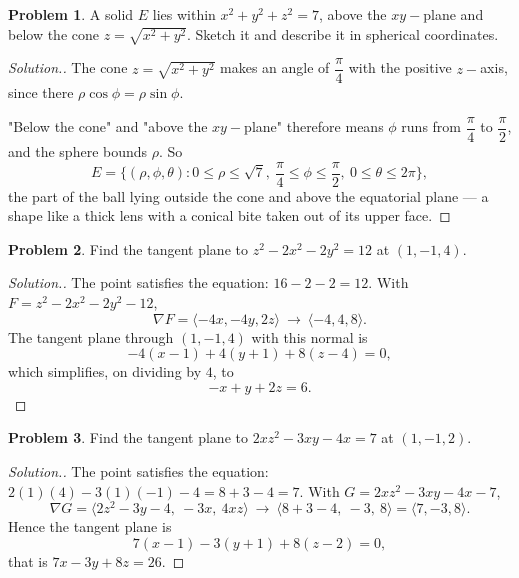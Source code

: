 \documentclass[11pt,a4paper]{article}
\theoremstyle{definition}
\newtheorem{problemx}{Problem}[subsection]
\newenvironment{problem}{\begin{problemx}}{\end{problemx}}
\newenvironment{solution}
  {\renewcommand{\qedsymbol}{}\begin{proof}[\textit{Solution}.]}
  {\end{proof}}
\begin{document}
\begin{problem}
A solid $E$ lies within $x^2+y^2+z^2 = 7$, above the $xy-$plane and below the
cone $z = \sqrt{x^2+y^2}$. Sketch it and describe it in spherical coordinates.
\end{problem}
\begin{solution}
The cone $z = \sqrt{x^2+y^2}$ makes an angle of $\dfrac{\pi}{4}$ with the
positive $z-$axis, since there $\rho\cos\phi = \rho\sin\phi$.

"Below the cone" and "above the $xy-$plane" therefore means $\phi$ runs from
$\dfrac{\pi}{4}$ to $\dfrac{\pi}{2}$, and the sphere bounds $\rho$. So
$$E = \Big\{(\rho,\phi,\theta): 0\leq\rho\leq\sqrt7,\
\frac{\pi}{4}\leq\phi\leq\frac{\pi}{2},\ 0\leq\theta\leq 2\pi\Big\},$$
the part of the ball lying outside the cone and above the equatorial plane ---
a shape like a thick lens with a conical bite taken out of its upper face.
\end{solution}

\begin{problem}
Find the tangent plane to $z^2-2x^2-2y^2 = 12$ at $(1,-1,4)$.
\end{problem}
\begin{solution}
The point satisfies the equation: $16-2-2 = 12$. With
$F = z^2-2x^2-2y^2-12$,
$$\nabla F = \langle -4x, -4y, 2z\rangle
\ \longrightarrow\ \langle -4, 4, 8\rangle .$$
The tangent plane through $(1,-1,4)$ with this normal is
$$-4(x-1) + 4(y+1) + 8(z-4) = 0 ,$$
which simplifies, on dividing by $4$, to
$$-x + y + 2z = 6 .$$
\end{solution}

\begin{problem}
Find the tangent plane to $2xz^2-3xy-4x = 7$ at $(1,-1,2)$.
\end{problem}
\begin{solution}
The point satisfies the equation: $2(1)(4) - 3(1)(-1) - 4 = 8+3-4 = 7$. With
$G = 2xz^2-3xy-4x-7$,
$$\nabla G = \langle 2z^2-3y-4,\ -3x,\ 4xz\rangle
\ \longrightarrow\ \langle 8+3-4,\ -3,\ 8\rangle = \langle 7,-3,8\rangle .$$
Hence the tangent plane is
$$7(x-1) - 3(y+1) + 8(z-2) = 0 ,$$
that is $7x-3y+8z = 26$.
\end{solution}
\end{document}
